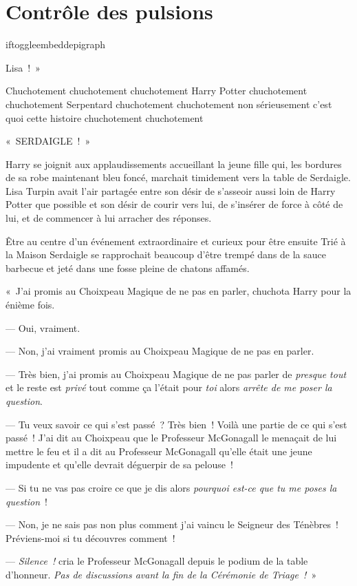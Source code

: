 \chapter{Contrôle des pulsions}

iftoggle{embeddepigraph}{}{}

 Lisa~!~»

\hplettrineextrapara
Chuchotement chuchotement chuchotement Harry Potter chuchotement chuchotement Serpentard chuchotement chuchotement non sérieusement c'est quoi cette histoire chuchotement chuchotement

«~SERDAIGLE~!~»

Harry se joignit aux applaudissements accueillant la jeune fille qui, les bordures de sa robe maintenant bleu foncé, marchait timidement vers la table de Serdaigle. Lisa Turpin avait l'air partagée entre son désir de s'asseoir aussi loin de Harry Potter que possible et son désir de courir vers lui, de s'insérer de force à côté de lui, et de commencer à lui arracher des réponses.

Être au centre d'un événement extraordinaire et curieux pour être ensuite Trié à la Maison Serdaigle se rapprochait beaucoup d'être trempé dans de la sauce barbecue et jeté dans une fosse pleine de chatons affamés.

«~J'ai promis au Choixpeau Magique de ne pas en parler, chuchota Harry pour la énième fois.

--- Oui, vraiment.

--- Non, j'ai vraiment promis au Choixpeau Magique de ne pas en parler.

--- Très bien, j'ai promis au Choixpeau Magique de ne pas parler de \emph{presque tout} et le reste est \emph{privé} tout comme ça l'était pour \emph{toi} alors \emph{arrête de me poser la question}.

--- Tu veux savoir ce qui s'est passé~? Très bien~! Voilà une partie de ce qui s'est passé~! J'ai dit au Choixpeau que le Professeur McGonagall le menaçait de lui mettre le feu et il a dit au Professeur McGonagall qu'elle était une jeune impudente et qu'elle devrait déguerpir de sa pelouse~!

--- Si tu ne vas pas croire ce que je dis alors \emph{pourquoi est-ce que tu me poses la question}~!

--- Non, je ne sais pas non plus comment j'ai vaincu le Seigneur des Ténèbres~! Préviens-moi si tu découvres comment~!

--- \emph{Silence~!} cria le Professeur McGonagall depuis le podium de la table d'honneur. \emph{Pas de discussions avant la fin de la Cérémonie de Triage~!}~»

